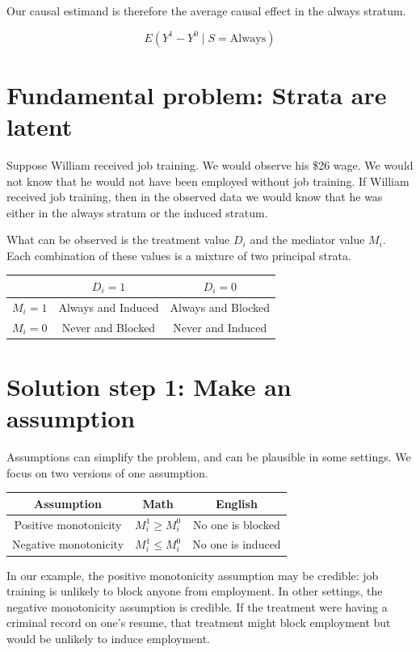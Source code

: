 \documentclass[
]{book}
\begin{document}
Our causal estimand is therefore the average causal effect in the always stratum.

\[E(Y^1 - Y^0 \mid S = \text{Always})\]

\section{Fundamental problem: Strata are latent}\label{fundamental-problem-strata-are-latent}

Suppose William received job training. We would observe his \$26 wage. We would not know that he would not have been employed without job training. If William received job training, then in the observed data we would know that he was either in the always stratum or the induced stratum.

What can be observed is the treatment value \(D_i\) and the mediator value \(M_i\). Each combination of these values is a mixture of two principal strata.

\begin{longtable}[]{@{}ccc@{}}
\toprule\noalign{}
& \(D_i = 1\) & \(D_i = 0\) \\
\midrule\noalign{}
\endhead
\bottomrule\noalign{}
\endlastfoot
\(M_i = 1\) & Always and Induced & Always and Blocked \\
\(M_i = 0\) & Never and Blocked & Never and Induced \\
\end{longtable}

\section{Solution step 1: Make an assumption}\label{solution-step-1-make-an-assumption}

Assumptions can simplify the problem, and can be plausible in some settings. We focus on two versions of one assumption.

\begin{longtable}[]{@{}ccc@{}}
\toprule\noalign{}
Assumption & Math & English \\
\midrule\noalign{}
\endhead
\bottomrule\noalign{}
\endlastfoot
Positive monotonicity & \(M_i^1 \geq M_i^0\) & No one is blocked \\
Negative monotonicity & \(M_i^1\leq M_i^0\) & No one is induced \\
\end{longtable}

In our example, the positive monotonicity assumption may be credible: job training is unlikely to block anyone from employment. In other settings, the negative monotonicity assumption is credible. If the treatment were having a criminal record on one's resume, that treatment might block employment but would be unlikely to induce employment.
\end{document}
